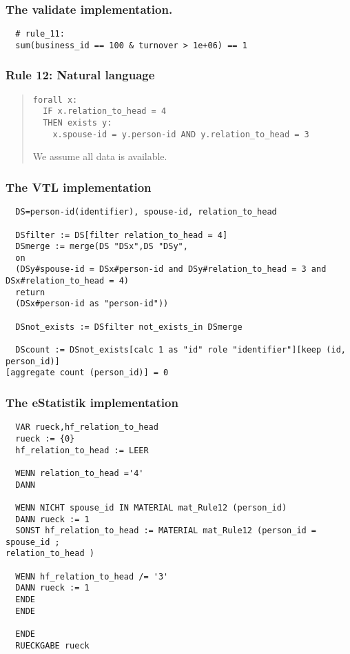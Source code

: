 \subsubsection*{The validate implementation.}
\begin{verbatim}
  # rule_11:
  sum(business_id == 100 & turnover > 1e+06) == 1
\end{verbatim}


\newpage

\subsubsection*{  Rule 12: Natural language}
\begin{quote}


\begin{verbatim}
forall x: 
  IF x.relation_to_head = 4 
  THEN exists y:
    x.spouse-id = y.person-id AND y.relation_to_head = 3
\end{verbatim}

We assume all data is available.


\end{quote}
\subsubsection*{The VTL implementation}
\begin{verbatim}
  DS=person-id(identifier), spouse-id, relation_to_head

  DSfilter := DS[filter relation_to_head = 4]
  DSmerge := merge(DS "DSx",DS "DSy",
  on
  (DSy#spouse-id = DSx#person-id and DSy#relation_to_head = 3 and
DSx#relation_to_head = 4)
  return
  (DSx#person-id as "person-id"))

  DSnot_exists := DSfilter not_exists_in DSmerge

  DScount := DSnot_exists[calc 1 as "id" role "identifier"][keep (id, person_id)]
[aggregate count (person_id)] = 0
\end{verbatim}
\subsubsection*{The eStatistik implementation}
\begin{verbatim}
  VAR rueck,hf_relation_to_head
  rueck := {0}
  hf_relation_to_head := LEER

  WENN relation_to_head ='4'
  DANN

  WENN NICHT spouse_id IN MATERIAL mat_Rule12 (person_id)
  DANN rueck := 1
  SONST hf_relation_to_head := MATERIAL mat_Rule12 (person_id = spouse_id ;
relation_to_head )

  WENN hf_relation_to_head /= '3'
  DANN rueck := 1
  ENDE
  ENDE

  ENDE
  RUECKGABE rueck
\end{verbatim}
